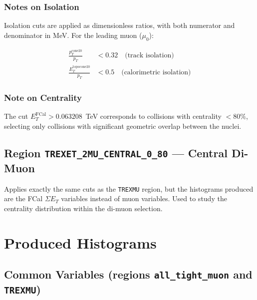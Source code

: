 \documentclass[12pt,a4paper]{article}
\begin{document}
\subsubsection*{Notes on Isolation}

Isolation cuts are applied as dimensionless ratios, with both numerator
and denominator in MeV. For the leading muon ($\mu_0$):

\begin{align}
    \frac{p_T^{\text{cone20}}}{p_T} &< 0.32 \quad \text{(track isolation)} \\[6pt]
    \frac{E_T^{\text{topocone20}}}{p_T} &< 0.5  \quad \text{(calorimetric isolation)}
\end{align}

\subsubsection*{Note on Centrality}

The cut $E_T^{\text{FCal}} > 0.063208$~TeV corresponds to collisions with
centrality $< 80\%$, selecting only collisions with significant geometric
overlap between the nuclei.

\subsection{Region \texttt{TREXET\_2MU\_CENTRAL\_0\_80} --- Central Di-Muon}

Applies exactly the same cuts as the \texttt{TREXMU} region, but the
histograms produced are the FCal $\Sigma E_T$ variables instead of muon
variables. Used to study the centrality distribution within the di-muon selection.

\section{Produced Histograms}

\subsection{Common Variables (regions \texttt{all\_tight\_muon} and \texttt{TREXMU})}
\end{document}
